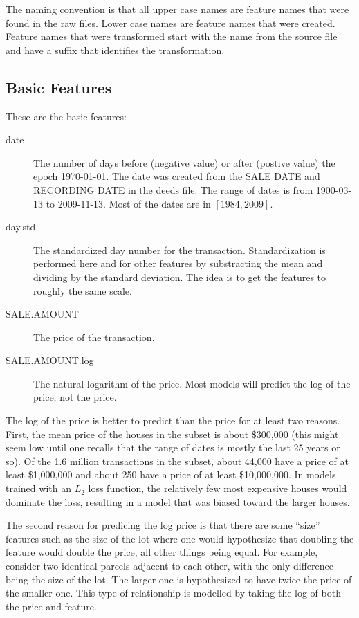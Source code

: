 The naming convention is that all upper case names are feature names
that were found in the raw files. Lower case names are feature names
that were created. Feature names that were transformed start with the
name from the source file and have a suffix that identifies the
transformation.

\subsection{Basic Features}

These are the basic features:
\begin{description}
\item[date] The number of days before (negative value) or after
  (postive value) the epoch 1970-01-01. The date was created from the
  SALE DATE and RECORDING DATE in the deeds file. The range of dates
  is from 1900-03-13 to 2009-11-13. Most of the dates are in
  $[1984,2009]$.
\item[day.std] The standardized day number for the
  transaction. Standardization is performed here and for other
  features by substracting the mean and dividing by the standard
  deviation. The idea is to get the features to roughly the same
  scale.
\item[SALE.AMOUNT] The price of the transaction.
\item[SALE.AMOUNT.log] The natural logarithm of the price. Most models
  will predict the log of the price, not the price. 
\end{description}

The log of the price is better to predict than the price for at least
two reasons. First, the mean price of the houses in the subset is
about \$300,000 (this might seem low until one recalls that the range
of dates is mostly the last 25 years or so). Of the 1.6 million
transactions in the subset, about 44,000 have a price of at least
\$1,000,000 and about 250 have a price of at least \$10,000,000. In
models trained with an $L_2$ loss function, the relatively few most
expensive houses would dominate the loss, resulting in a model that
was biased toward the larger houses.

The second reason for predicing the log price is that there are some
``size'' features such as the size of the lot where one would
hypothesize that doubling the feature would double the price, all
other things being equal. For example, consider two identical parcels
adjacent to each other, with the only difference being the size of the
lot. The larger one is hypothesized to have twice the price of the
smaller one. This type of relationship is modelled by taking the log
of both the price and feature.

